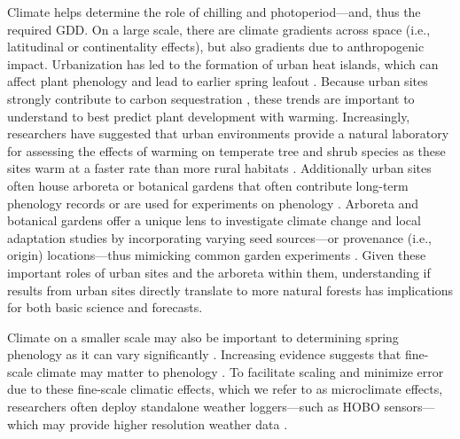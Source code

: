 \documentclass{article}\usepackage[]{graphicx}\usepackage[]{color}
\begin{document}
Climate helps determine the role of chilling and photoperiod---and, thus the required GDD. On a large scale, there are climate gradients across space (i.e., latitudinal or continentality effects), but also gradients due to anthropogenic impact. Urbanization has led to the formation of urban heat islands, which can affect plant phenology and lead to earlier spring leafout \citep{Meng2020}. Because urban sites strongly contribute to carbon sequestration \citep{Ziter2018}, these trends are important to understand to best predict plant development with warming. Increasingly, researchers have suggested that urban environments provide a natural laboratory for assessing the effects of warming on temperate tree and shrub species as these sites warm at a faster rate than more rural habitats \citep{Grimm2008,Pickett2011}. Additionally urban sites often house arboreta or botanical gardens that often contribute long-term phenology records \citep{Zohner2014} or are used for experiments on phenology \citep{Ettinger2018}. Arboreta and botanical gardens offer a unique lens to investigate climate change and local adaptation studies by incorporating varying seed sources---or provenance (i.e., origin) locations---thus mimicking common garden experiments \citep{Primack2009}. Given these important roles of urban sites and the arboreta within them, understanding if results from urban sites directly translate to more natural forests has implications for both basic science and forecasts.  
  
Climate on a smaller scale may also be important to determining spring phenology as it can vary significantly \citep[e.g., as much as 2.6$^{\circ}$C between sensors at the same vineyard or up to 6.6$^{\circ}$C within 1 km spatial units in northern Europe,][]{Lenoir2013,deResseguier2020}. Increasing evidence suggests that fine-scale climate may matter to phenology \citep{Lembrechts2019}. To facilitate scaling and minimize error due to these fine-scale climatic effects, which we refer to as microclimate effects, researchers often deploy standalone weather loggers---such as HOBO sensors---which may provide higher resolution weather data \citep{Schwartz2013a,Whiteman2000}.  
 
\end{document}
